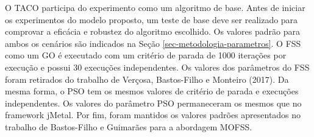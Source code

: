 O TACO participa do experimento como um algoritmo de base. Antes de iniciar os experimentos do modelo proposto, um teste de base deve ser realizado para comprovar a eficácia e robustez do algoritmo escolhido. Os valores padrão para ambos os cenários são indicados na Seção \ref{sec-metodologia-parametros}. O FSS como um GO é executado com um critério de parada de 1000 iterações por execução e possui 30 execuções independentes. Os valores dos parâmetros do FSS foram retirados do trabalho de Verçosa, Bastos-Filho e Monteiro (2017). Da mesma forma, o PSO tem os mesmos valores de critério de parada e execuções independentes. Os valores do parâmetro PSO permaneceram os mesmos que no framework jMetal. Por fim, foram mantidos os valores padrões apresentados no trabalho de Bastos-Filho e Guimarães para a abordagem MOFSS.